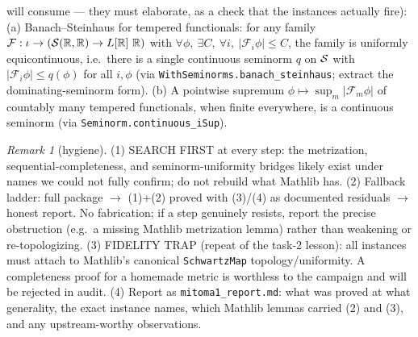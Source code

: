 \documentclass[11pt]{article}
\theoremstyle{plain}
\theoremstyle{remark}
\newtheorem{remark}{Remark}
\begin{document}
\begin{itemize}
will consume --- they must elaborate, as a check that the instances
actually fire): (a) Banach--Steinhaus for tempered functionals: for any
family $\mathcal F:\iota\to(\mathcal{S}(\mathbb{R},\mathbb{R})\to L[\mathbb{R}]\ \mathbb{R})$ with
$\forall\phi,\ \exists C,\ \forall i,\ |\mathcal F_i\phi|\le C$, the
family is uniformly equicontinuous, i.e.\ there is a single continuous
seminorm $q$ on $\mathcal{S}$ with $|\mathcal F_i\phi|\le q(\phi)$ for all
$i,\phi$ (via \texttt{WithSeminorms.banach\_steinhaus}; extract the
dominating-seminorm form). (b) A pointwise supremum
$\phi\mapsto\sup_{m}|\mathcal F_m\phi|$ of countably many tempered
functionals, when finite everywhere, is a continuous seminorm (via
\texttt{Seminorm.continuous\_iSup}).
\end{itemize}

\begin{remark}[hygiene]
(1) SEARCH FIRST at every step: the metrization, sequential-completeness,
and seminorm-uniformity bridges likely exist under names we could not
fully confirm; do not rebuild what Mathlib has.
(2) Fallback ladder: full package $\to$ (1)+(2) proved with (3)/(4) as
documented residuals $\to$ honest report. No fabrication; if a step
genuinely resists, report the precise obstruction (e.g.\ a missing
Mathlib metrization lemma) rather than weakening or re-topologizing.
(3) FIDELITY TRAP (repeat of the task-2 lesson): all instances must
attach to Mathlib's canonical \texttt{SchwartzMap} topology/uniformity.
A completeness proof for a homemade metric is worthless to the campaign
and will be rejected in audit.
(4) Report as \texttt{mitoma1\_report.md}: what was proved at what
generality, the exact instance names, which Mathlib lemmas carried
(2) and (3), and any upstream-worthy observations.
\end{remark}
\end{document}

